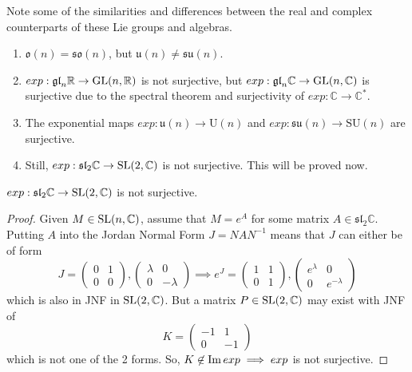     Note some of the similarities and differences between the real and complex counterparts of these Lie groups and algebras. 
    \begin{enumerate}
      \item $\mathfrak{o}(n) = \mathfrak{so}(n)$, but $\mathfrak{u}(n) \neq \mathfrak{su}(n)$. 
      \item $exp: \mathfrak{gl}_n \mathbb{R} \rightarrow \operatorname{GL}(n, \mathbb{R})$ is not surjective, but $exp: \mathfrak{gl}_n \mathbb{C} \rightarrow \operatorname{GL}(n, \mathbb{C})$ is surjective due to the spectral theorem and surjectivity of $exp: \mathbb{C} \rightarrow \mathbb{C}^*$.
      \item The exponential maps $exp: \mathfrak{u}(n) \rightarrow \text{U}(n)$ and $exp: \mathfrak{su}(n) \rightarrow \text{SU}(n)$ are surjective. 
      \item Still, $exp: \mathfrak{sl}_2 \mathbb{C} \rightarrow \operatorname{SL}(2, \mathbb{C})$ is not surjective. This will be proved now. 
    \end{enumerate}

    \begin{theorem}
      $exp: \mathfrak{sl}_2 \mathbb{C} \rightarrow \operatorname{SL}(2, \mathbb{C})$ is not surjective. 
    \end{theorem}
    \begin{proof}
      Given $M \in \operatorname{SL}(n, \mathbb{C})$, assume that $M = e^A$ for some matrix $A \in \mathfrak{sl}_2 \mathbb{C}$. Putting $A$ into the Jordan Normal Form $J = N A N^{-1}$ means that $J$ can either be of form
      \begin{equation}
        J = \begin{pmatrix}
        0&1\\0&0
        \end{pmatrix}, \begin{pmatrix}
        \lambda&0\\0&-\lambda
        \end{pmatrix} \implies e^J = \begin{pmatrix}
        1&1\\0&1
        \end{pmatrix}, \begin{pmatrix}
        e^\lambda&0\\0&e^{-\lambda}
        \end{pmatrix}
      \end{equation}
      which is also in JNF in $\operatorname{SL}(2, \mathbb{C})$. But a matrix $P \in \operatorname{SL}(2, \mathbb{C})$ may exist with JNF of 
      \begin{equation}
        K = \begin{pmatrix}
        -1&1\\0&-1
        \end{pmatrix}
      \end{equation}
      which is not one of the 2 forms. So, $K \not\in \operatorname{Im}{exp} \implies exp$ is not surjective. 
    \end{proof}

